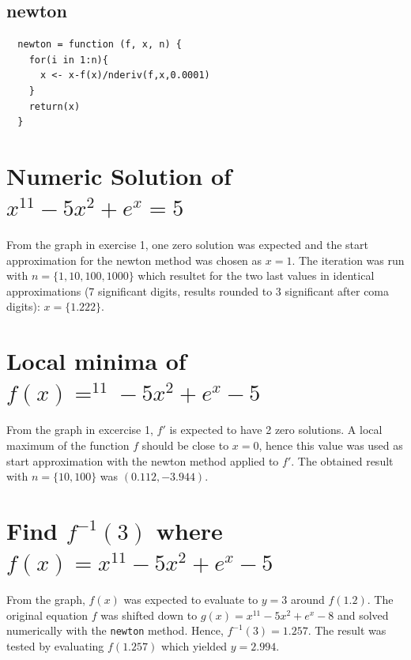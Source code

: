 \documentclass[a4paper,11pt,twoside]{article}
\begin{document}
\subsection{newton}
\begin{lstlisting}
  newton = function (f, x, n) {
    for(i in 1:n){
      x <- x-f(x)/nderiv(f,x,0.0001)
    }
    return(x)
  }
\end{lstlisting}



\section{Numeric Solution of $x^{11}-5x^2+e^x=5$}
From the graph in exercise 1, one zero solution was expected and the start approximation for the newton method was chosen as  $x = 1$.
The iteration was run with $n = \{1,10,100, 1000\}$ which resultet for the two last values in identical approximations (7 significant digits, results rounded to 3 significant after coma digits): $x = \{1.222\}$.

\section{Local minima of $f(x) =^{11}-5x^2+e^x-5$}
From the graph in excercise 1, $f'$ is expected to have 2 zero solutions. A local maximum of the function $f$ should be close to $x = 0$, hence this value was used as start approximation with the newton method applied to $f'$. The obtained result with $n = \{10, 100\}$ was $(0.112, -3.944)$.

\section{Find $f^{-1}(3)$ where $f(x) = x^{11}-5x^2+e^x-5$}
From the graph, $f(x)$ was expected to evaluate to $y = 3$ around $f(1.2)$. The original equation $f$ was shifted down to $g(x) = x^{11}-5x^2+e^x-8$ and solved numerically with the \verb+newton+ method.
Hence, $f^{-1}(3) = 1.257$. The result was tested by evaluating $f(1.257)$ which yielded $y = 2.994$.
 

\end{document}
